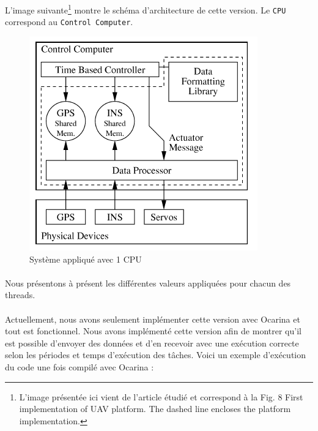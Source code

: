 \documentclass[a4paper,12pt]{report}
\begin{document}
			L'image suivante\footnote{L'image présentée ici vient de l'article étudié et correspond à la Fig. 8 First implementation of UAV platform. The dashed line encloses the platform implementation.} montre le schéma d'architecture de cette version. Le \texttt{CPU} correspond au \texttt{Control Computer}.
			\begin{figure}[H]
				\centering
					\includegraphics[scale=0.7]{cpu1.png}
					\caption{Système appliqué avec 1 CPU}
				\label{cpu1}
			\end{figure}
			
			
			\paragraph*{}
			Nous présentons à présent les différentes valeurs appliquées pour chacun des threads.
			
			\begin{table}[H]
			\centering
		\end{table}
		
		\paragraph*{}
		Actuellement, nous avons seulement implémenter cette version avec Ocarina et tout est fonctionnel. Nous avons implémenté cette version afin de montrer qu'il est possible d'envoyer des données et d'en recevoir avec une exécution correcte selon les périodes et temps d'exécution des tâches. Voici un exemple d'exécution du code une fois compilé avec Ocarina :
		
\end{document}
